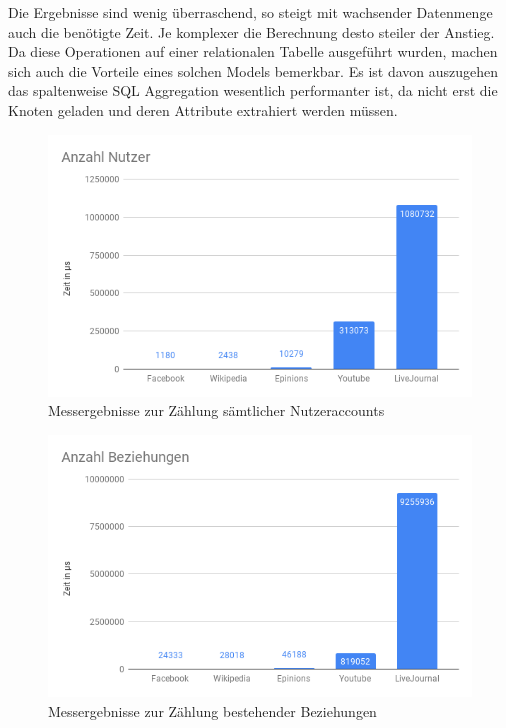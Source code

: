 Die Ergebnisse sind wenig überraschend, so steigt mit wachsender Datenmenge auch die benötigte Zeit. Je komplexer die Berechnung desto steiler der Anstieg. Da diese Operationen auf einer relationalen Tabelle ausgeführt wurden, machen sich auch die Vorteile eines solchen Models bemerkbar. Es ist davon auszugehen das spaltenweise SQL Aggregation wesentlich performanter ist, da nicht erst die Knoten geladen und deren Attribute extrahiert werden müssen.

\begin{figure}[h!]
	\centering
	\includegraphics[width=\textwidth]{images/AnzahlNutzer.png}
	\caption{Messergebnisse zur Zählung sämtlicher Nutzeraccounts}
	\label{fig:AnzahlNutzer}
\end{figure}

\begin{figure}[h!]
	\centering
	\includegraphics[width=\textwidth]{images/AnzahlBeziehung.png}
	\caption{Messergebnisse zur Zählung bestehender Beziehungen}
	\label{fig:AnzahlBeziehung}
\end{figure}

